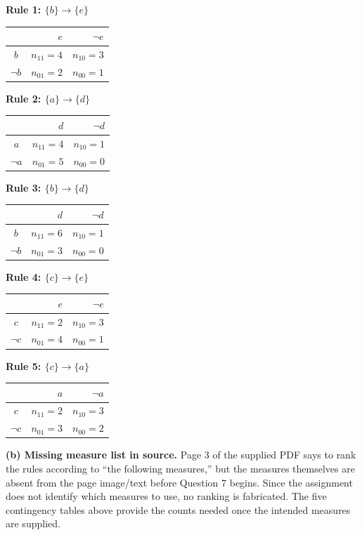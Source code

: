 \documentclass[11pt,a4paper]{article}
\begin{document}
\small
\begin{center}
\textbf{Rule 1: \(\{b\}\to\{e\}\)}
\begin{tabular}{c|rr}
&\(e\)&\(\neg e\)\\\hline
\(b\)&\(n_{11}=4\)&\(n_{10}=3\)\\
\(\neg b\)&\(n_{01}=2\)&\(n_{00}=1\)
\end{tabular}

\vspace{4pt}
\textbf{Rule 2: \(\{a\}\to\{d\}\)}
\begin{tabular}{c|rr}
&\(d\)&\(\neg d\)\\\hline
\(a\)&\(n_{11}=4\)&\(n_{10}=1\)\\
\(\neg a\)&\(n_{01}=5\)&\(n_{00}=0\)
\end{tabular}

\vspace{4pt}
\textbf{Rule 3: \(\{b\}\to\{d\}\)}
\begin{tabular}{c|rr}
&\(d\)&\(\neg d\)\\\hline
\(b\)&\(n_{11}=6\)&\(n_{10}=1\)\\
\(\neg b\)&\(n_{01}=3\)&\(n_{00}=0\)
\end{tabular}

\vspace{4pt}
\textbf{Rule 4: \(\{c\}\to\{e\}\)}
\begin{tabular}{c|rr}
&\(e\)&\(\neg e\)\\\hline
\(c\)&\(n_{11}=2\)&\(n_{10}=3\)\\
\(\neg c\)&\(n_{01}=4\)&\(n_{00}=1\)
\end{tabular}

\vspace{4pt}
\textbf{Rule 5: \(\{c\}\to\{a\}\)}
\begin{tabular}{c|rr}
&\(a\)&\(\neg a\)\\\hline
\(c\)&\(n_{11}=2\)&\(n_{10}=3\)\\
\(\neg c\)&\(n_{01}=3\)&\(n_{00}=2\)
\end{tabular}
\end{center}
\normalsize

\textbf{(b) Missing measure list in source.} Page 3 of the supplied PDF says to rank the rules according to ``the following measures,'' but the measures themselves are absent from the page image/text before Question 7 begins. Since the assignment does not identify which measures to use, no ranking is fabricated. The five contingency tables above provide the counts needed once the intended measures are supplied.
\end{document}
